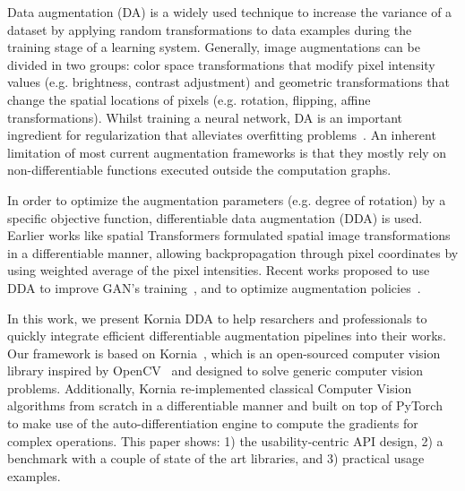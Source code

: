Data augmentation (DA) is a widely used technique to increase the variance of a dataset by applying random transformations to data examples during the training stage of a learning system. Generally, image augmentations can be divided in two groups: color space transformations that modify pixel intensity values (e.g. brightness, contrast adjustment) and geometric transformations that change the spatial locations of pixels  (e.g. rotation, flipping, affine transformations). Whilst training a neural network, DA is an important ingredient for regularization that alleviates overfitting problems~\cite{deeplearningbook2016}. An inherent limitation of most current augmentation frameworks is that they mostly rely on non-differentiable functions executed outside the computation graphs.

In order to optimize the augmentation parameters (e.g. degree of rotation) by a specific objective function, differentiable data augmentation (DDA) is used. Earlier works like spatial Transformers \cite{SpatialTransformers2015} formulated spatial image transformations in a differentiable manner, allowing backpropagation through pixel coordinates by using weighted average of the pixel intensities. Recent works proposed to use DDA to improve GAN's training~\citep{zhao2020differentiable}, and to optimize augmentation policies~\citep{hataya2020meta, hataya2019faster}.
 
In this work, we present Kornia DDA to help resarchers and professionals to quickly integrate efficient differentiable augmentation pipelines into their works. Our framework is based on Kornia~\citep{eriba2019kornia, eriba2020kornia}, which is an open-sourced computer vision library inspired by OpenCV~\citep{opencv} and designed to solve generic computer vision problems. Additionally, Kornia re-implemented classical Computer Vision algorithms from scratch in a differentiable manner and built on top of PyTorch~\citep{paszke2017automatic} to make use of the auto-differentiation engine to compute the gradients for complex operations. This paper shows: 1) the usability-centric API design, 2) a benchmark with a couple of state of the art libraries, and 3) practical usage examples.

